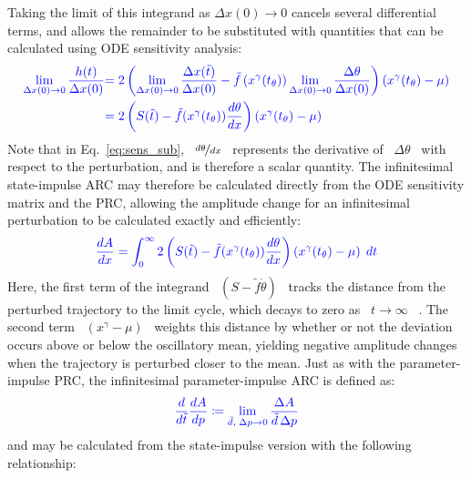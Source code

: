 \documentclass[11pt, letterpaper]{article}
\providecommand{\DIFadd}[1]{{\protect\color{blue}#1}} %
\providecommand{\DIFaddbegin}{} %
\providecommand{\DIFaddend}{} %
\begin{document}
\DIFaddend Taking the limit of this \DIFaddbegin \DIFadd{integrand }\DIFaddend as $\Delta x(0) \to 0$ \DIFaddbegin \DIFadd{cancels several differential terms, and allows the remainder }\DIFaddend to be substituted with quantities that can be calculated using ODE sensitivity analysis:
\DIFaddbegin \begin{align}\DIFadd{
  \lim_{\Delta x(0) \to 0} \frac{h(t)}{\Delta x(0)} }&\DIFadd{= 2\left(\lim_{\Delta x(0) \to 0}\frac{\Delta x(\tilde{t})}{\Delta x(0)} - \tilde{f}\left(x^\gamma(t_\theta)\right)\lim_{\Delta x(0) \to 0}\frac{\Delta\theta}{\Delta x(0)}\right) \left(x^\gamma(t_\theta) - \mu\right)}\\
  &\DIFadd{= 2\left(S(\tilde{t}) - \tilde{f}(x^\gamma(t_\theta))\frac{d\theta}{dx}\right)\left(x^\gamma(t_\theta) - \mu\right)
  \label{eq:sens_sub}
}\end{align}
\DIFadd{Note that in Eq.~\ref{eq:sens_sub}, \mbox{%
$\nicefrac{d\theta}{dx}$
}%
represents the derivative of \mbox{%
$\Delta\theta$
}%
with respect to the perturbation, and is therefore a scalar quantity.
}\DIFaddend The infinitesimal state-impulse ARC may therefore be calculated directly from the ODE sensitivity matrix and the PRC\DIFaddbegin \DIFadd{, allowing the amplitude change for an infinitesimal perturbation to be calculated exactly and efficiently:
}\begin{equation}\DIFadd{
  \frac{dA}{dx} = \int_0^\infty 2\left(S(\tilde{t}) - \tilde{f}(x^\gamma(t_\theta))\frac{d\theta}{dx}\right)\left(x^\gamma(t_\theta) - \mu\right) \; dt
  \label{eq:siARC}
}\end{equation}
\DIFadd{Here, the first term of the integrand \mbox{%
$(S - \tilde{f}\dot{\theta})$
}%
tracks the distance from the perturbed trajectory to the limit cycle, which decays to zero as \mbox{%
$t \to \infty$
}%
.
The second term \mbox{%
$(x^\gamma - \mu)$
}%
weights this distance by whether or not the deviation occurs above or below the oscillatory mean, yielding negative amplitude changes when the trajectory is perturbed closer to the mean.
}\DIFaddend Just as with the parameter-impulse PRC, the infinitesimal parameter-impulse ARC \DIFaddbegin \DIFadd{is defined as:
}\begin{equation}\DIFadd{
  \frac{d}{d\tilde{t}}\frac{dA}{dp} \coloneqq \lim_{\tilde{d},\; \Delta p \to 0} \frac{\Delta A}{\tilde{d}\, \Delta p}
}\end{equation}
\DIFadd{and }\DIFaddend may be calculated from the state-impulse version with the following relationship:
\end{document}
